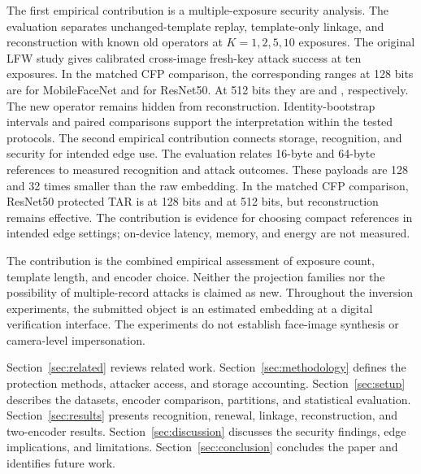 The first empirical contribution is a multiple-exposure security analysis. The evaluation separates unchanged-template replay, template-only linkage, and reconstruction with known old operators at $K=1,2,5,10$ exposures. The original LFW study gives \LfwBaselineAsr{} calibrated cross-image fresh-key attack success at ten exposures. In the matched CFP comparison, the corresponding ranges at 128 bits are \MbfSmallAsr{} for MobileFaceNet and \RnetSmallAsr{} for ResNet50. At 512 bits they are \MbfLargeAsr{} and \RnetLargeAsr{}, respectively. The new operator remains hidden from reconstruction. Identity-bootstrap intervals and paired comparisons support the interpretation within the tested protocols.
The second empirical contribution connects storage, recognition, and security for intended edge use. The evaluation relates 16-byte and 64-byte references to measured recognition and attack outcomes. These payloads are 128 and 32 times smaller than the raw embedding. In the matched CFP comparison, ResNet50 protected TAR is \RnetSmallTar{} at 128 bits and \RnetLargeTar{} at 512 bits, but reconstruction remains effective. The contribution is evidence for choosing compact references in intended edge settings; on-device latency, memory, and energy are not measured.

The contribution is the combined empirical assessment of exposure count, template length, and encoder choice. Neither the projection families nor the possibility of multiple-record attacks is claimed as new. Throughout the inversion experiments, the submitted object is an estimated embedding at a digital verification interface. The experiments do not establish face-image synthesis or camera-level impersonation.


Section~\ref{sec:related} reviews related work. Section~\ref{sec:methodology} defines the protection methods, attacker access, and storage accounting. Section~\ref{sec:setup} describes the datasets, encoder comparison, partitions, and statistical evaluation. Section~\ref{sec:results} presents recognition, renewal, linkage, reconstruction, and two-encoder results. Section~\ref{sec:discussion} discusses the security findings, edge implications, and limitations. Section~\ref{sec:conclusion} concludes the paper and identifies future work.
